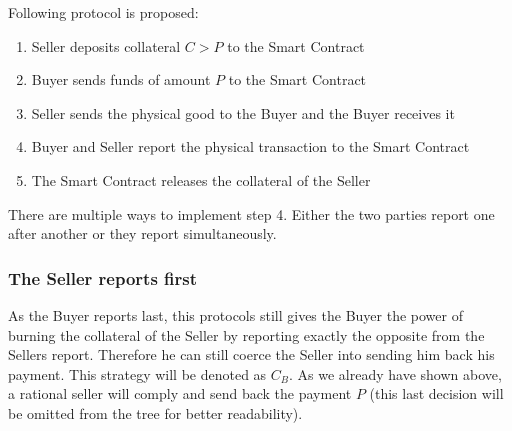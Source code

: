 \documentclass{cacthesis}
\begin{document}
Following protocol is proposed:
\begin{enumerate}
    \item Seller deposits collateral $C > P$ to the Smart Contract
    \item Buyer sends funds of amount $P$ to the Smart Contract 
    \item Seller sends the physical good to the Buyer and the Buyer receives it
    \item Buyer and Seller report the physical transaction to the Smart Contract
    \item The Smart Contract releases the collateral of the Seller
\end{enumerate}
There are multiple ways to implement step 4. Either the two parties report one after another or they report simultaneously.
\subsubsection{The Seller reports first}
As the Buyer reports last, this protocols still gives the Buyer the power of burning the collateral of the Seller by reporting exactly the opposite from the Sellers report.\newline
Therefore he can still coerce the Seller into sending him back his payment. This strategy will be denoted as $C_B$. As we already have shown above, a rational seller will comply and send back the payment $P$ (this last decision will be omitted from the tree for better readability).\newline
\end{document}
